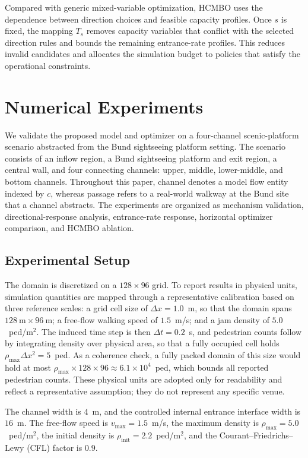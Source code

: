 \documentclass[lettersize,journal]{IEEEtran}
\begin{document}
Compared with generic mixed-variable optimization, HCMBO uses the dependence between direction choices and feasible capacity profiles.
Once $s$ is fixed, the mapping $T_s$ removes capacity variables that conflict with the selected direction rules and bounds the remaining entrance-rate profiles.
This reduces invalid candidates and allocates the simulation budget to policies that satisfy the operational constraints.


\section{Numerical Experiments}
\label{sec:experiments}

We validate the proposed model and optimizer on a four-channel scenic-platform scenario abstracted from the Bund sightseeing platform setting.
The scenario consists of an inflow region, a Bund sightseeing platform and exit region, a central wall, and four connecting channels: upper, middle, lower-middle, and bottom channels.
Throughout this paper, channel denotes a model flow entity indexed by $c$, whereas passage refers to a real-world walkway at the Bund site that a channel abstracts.
The experiments are organized as mechanism validation, directional-response analysis, entrance-rate response, horizontal optimizer comparison, and HCMBO ablation.

\subsection{Experimental Setup}
\label{sec:setup}

The domain is discretized on a $128\times96$ grid.
To report results in physical units, simulation quantities are mapped through a representative calibration based on three reference scales: a grid cell size of $\Delta x=1.0$~m, so that the domain spans $128~\mathrm{m}\times96~\mathrm{m}$; a free-flow walking speed of $1.5$~m/s; and a jam density of $5.0$~ped/m$^2$.
The induced time step is then $\Delta t=0.2$~s, and pedestrian counts follow by integrating density over physical area, so that a fully occupied cell holds $\rho_{\max}\Delta x^2=5$~ped. As a coherence check, a fully packed domain of this size would hold at most $\rho_{\max}\times128\times96\approx6.1\times10^4$~ped, which bounds all reported pedestrian counts.
These physical units are adopted only for readability and reflect a representative assumption; they do not represent any specific venue.

The channel width is $4$~m, and the controlled internal entrance interface width is $16$~m.
The free-flow speed is $v_{\max}=1.5$~m/s, the maximum density is $\rho_{\max}=5.0$~ped/m$^2$, the initial density is $\rho_{\mathrm{init}}=2.2$~ped/m$^2$, and the Courant--Friedrichs--Lewy (CFL) factor is $0.9$.
\end{document}
